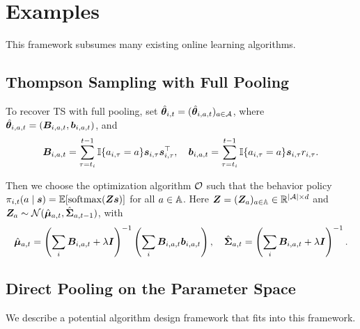 \documentclass{article}
\newcommand{\sam}[1]{
  {\color{blue} [SAM: {#1}]}
 }
\begin{document}
\section{Examples}

This framework subsumes many existing online learning algorithms.

\subsection{Thompson Sampling with Full Pooling} 

To recover TS with full pooling, set $\hat {{\bm{\theta}}}_{i, t} = (\hat {{\bm{\theta}}}_{i, a, t})_{a \in {\mathcal{A}}}$, where $\hat {{\bm{\theta}}}_{i, a, t} = ({\bm{B}}_{i, a, t}, {\bm{b}}_{i, a, t})$, and
$$
    {\bm{B}}_{i, a, t} = \sum_{\tau = t_i}^{t-1} {\mathbb{I}}\{a_{i, \tau} = a\} {\bm{s}}_{i, \tau} {\bm{s}}_{i, \tau}^{\top}, \quad {\bm{b}}_{i, a, t} = \sum_{\tau = t_i}^{t-1} {\mathbb{I}}\{a_{i, \tau} = a\} {\bm{s}}_{i, \tau} r_{i, \tau}.
$$

Then we choose the optimization algorithm ${\mathcal{O}}$ such that the behavior policy $\pi_{i, t}(a \mid {\bm{s}}) = \mathbb{E}[\operatorname{softmax}({\bm{Z}} {\bm{s}})]$ for all $a \in {\mathbb{A}}$. Here ${\bm{Z}} = ({\bm{Z}}_a)_{a \in {\mathbb{A}}} \in {\mathbb{R}}^{|{\mathcal{A}}| \times d}$ and ${\bm{Z}}_a \sim {\mathcal{N}}(\hat {{\bm{\mu}}}_{a,t}, \hat {{\bm{\Sigma}}}_{a, t-1})$, with
$$
    \hat {{\bm{\mu}}}_{a, t} = \left(\sum_i {\bm{B}}_{i, a, t} + \lambda {\bm{I}}\right)^{-1} \left(\sum_i {\bm{B}}_{i, a, t} {\bm{b}}_{i, a, t}\right),
    \quad \hat {{\bm{\Sigma}}}_{a, t} = \left(\sum_i {\bm{B}}_{i, a, t} + \lambda {\bm{I}}\right)^{-1}.
$$

\subsection{Direct Pooling on the Parameter Space}

We describe a potential algorithm design framework that fits into this framework. 
\end{document}
